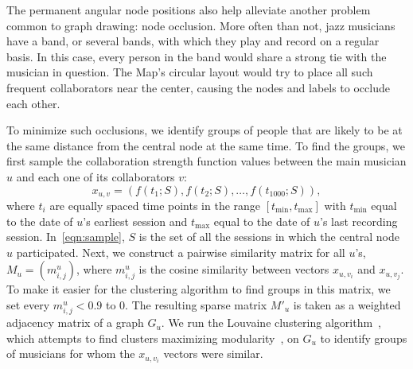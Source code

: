 \documentclass[12pt]{cmuthesis}
\begin{document}
  The permanent angular node positions also help alleviate another problem common
  to graph drawing: node occlusion. More often than not, jazz musicians have a
  band, or several bands, with which they play and record on a regular basis. In
  this case, every person in the band would share a strong tie with the musician
  in question. The Map's circular layout would try to place all such frequent
  collaborators near the center, causing the nodes and labels to occlude each
  other.

  To minimize such occlusions, we identify groups of people that are likely to be
  at the same distance from the central node at the same time. To find the groups,
  we first sample the collaboration strength function values between the main
  musician $u$ and each one of its collaborators $v$:
  \begin{equation}\label{eqn:sample}
    x_{u, v} = (f(t_1;S), f(t_2;S), \ldots, f(t_{1000};S)),
  \end{equation}
  where $t_i$ are equally spaced time points in the range
  $[t_\textrm{min}, t_\textrm{max}]$ with $t_\textrm{min}$ equal to the date of
  $u$'s earliest session and $t_\textrm{max}$ equal to the date of $u$'s last
  recording session. In~\eqref{eqn:sample}, $S$ is the set of all the sessions in
  which the central node $u$ participated.
  Next, we construct a pairwise similarity matrix for all $u$'s,
  $M_u = \left(m^u_{i,j}\right)$,
  where $m^u_{i, j}$ is the cosine similarity between vectors $x_{u,v_i}$ and
  $x_{u,v_j}$. To make it easier for the clustering algorithm to find groups in
  this matrix, we set every $m^u_{i,j} < 0.9$ to $0$. The resulting sparse matrix
  $M'_u$ is taken as a weighted adjacency matrix of a graph $G_u$. We run the
  Louvaine clustering algorithm~\cite{Blondel2008}, which attempts to find
  clusters maximizing modularity~\cite{newman06}, on $G_u$ to identify groups
  of musicians for whom the $x_{u, v_i}$ vectors were similar.
\end{document}
